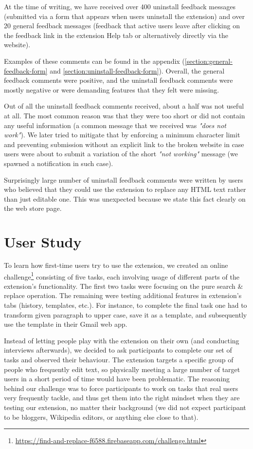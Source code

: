 \documentclass[bsc,frontabs,twoside,singlespacing,parskip,deptreport]{infthesis}
\begin{document}
At the time of writing, we have received over 400 uninstall feedback messages (submitted via a form that appears when users uninstall the extension) and over 20 general feedback messages (feedback that active users leave after clicking on the feedback link in the extension Help tab or alternatively directly via the website).

Examples of these comments can be found in the appendix (\autoref{section:general-feedback-form} and \autoref{section:uninstall-feedback-form}). Overall, the general feedback comments were positive, and the uninstall feedback comments were mostly negative or were demanding features that they felt were missing.

Out of all the uninstall feedback comments received, about a half was not useful at all. The most common reason was that they were too short or did not contain any useful information (a common message that we received was \textit{"does not work"}). We later tried to mitigate that by enforcing a minimum character limit and preventing submission without an explicit link to the broken website in case users were about to submit a variation of the short \textit{"not working"} message (we spawned a notification in such case).

Surprisingly large number of uninstall feedback comments were written by users who believed that they could use the extension to replace any HTML text rather than just editable one. This was unexpected because we state this fact clearly on the web store page.

\section{User Study}
To learn how first-time users try to use the extension, we created an online challenge\footnote{\url{https://find-and-replace-f6588.firebaseapp.com/challenge.html}} consisting of five tasks, each involving usage of different parts of the extension's functionality. The first two tasks were focusing on the pure search \& replace operation. The remaining were testing additional features in extension's tabs (history, templates, etc.). For instance, to complete the final task one had to transform given paragraph to upper case, save it as a template, and subsequently use the template in their Gmail web app.

Instead of letting people play with the extension on their own (and conducting interviews afterwards), we decided to ask participants to complete our set of tasks and observed their behaviour. The extension targets a specific group of people who frequently edit text, so physically meeting a large number of target users in a short period of time would have been problematic. The reasoning behind our challenge was to force participants to work on tasks that real users very frequently tackle, and thus get them into the right mindset when they are testing our extension, no matter their background (we did not expect participant to be bloggers, Wikipedia editors, or anything else close to that).
\end{document}
